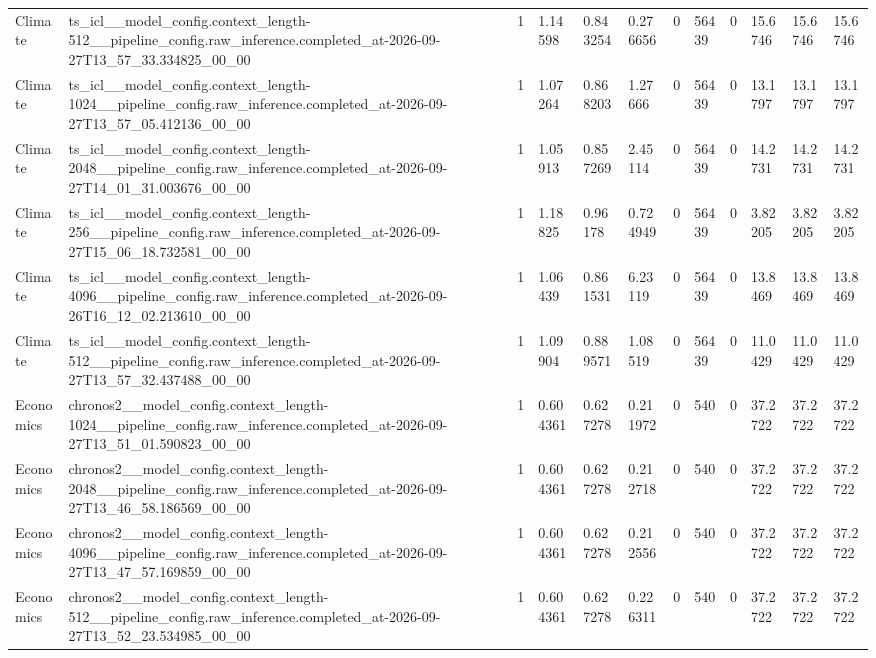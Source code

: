 \begin{tabular}{llllllllllll}
Climate & ts\_icl\_\_model\_config.context\_length-512\_\_pipeline\_config.raw\_inference.completed\_at-2026-09-27T13\_57\_33.334825\_00\_00 & 1 & 1.14598 & 0.843254 & 0.276656 & 0 & 56439 & 0 & 15.6746 & 15.6746 & 15.6746 \\
Climate & ts\_icl\_\_model\_config.context\_length-1024\_\_pipeline\_config.raw\_inference.completed\_at-2026-09-27T13\_57\_05.412136\_00\_00 & 1 & 1.07264 & 0.868203 & 1.27666 & 0 & 56439 & 0 & 13.1797 & 13.1797 & 13.1797 \\
Climate & ts\_icl\_\_model\_config.context\_length-2048\_\_pipeline\_config.raw\_inference.completed\_at-2026-09-27T14\_01\_31.003676\_00\_00 & 1 & 1.05913 & 0.857269 & 2.45114 & 0 & 56439 & 0 & 14.2731 & 14.2731 & 14.2731 \\
Climate & ts\_icl\_\_model\_config.context\_length-256\_\_pipeline\_config.raw\_inference.completed\_at-2026-09-27T15\_06\_18.732581\_00\_00 & 1 & 1.18825 & 0.96178 & 0.724949 & 0 & 56439 & 0 & 3.82205 & 3.82205 & 3.82205 \\
Climate & ts\_icl\_\_model\_config.context\_length-4096\_\_pipeline\_config.raw\_inference.completed\_at-2026-09-26T16\_12\_02.213610\_00\_00 & 1 & 1.06439 & 0.861531 & 6.23119 & 0 & 56439 & 0 & 13.8469 & 13.8469 & 13.8469 \\
Climate & ts\_icl\_\_model\_config.context\_length-512\_\_pipeline\_config.raw\_inference.completed\_at-2026-09-27T13\_57\_32.437488\_00\_00 & 1 & 1.09904 & 0.889571 & 1.08519 & 0 & 56439 & 0 & 11.0429 & 11.0429 & 11.0429 \\
Economics & chronos2\_\_model\_config.context\_length-1024\_\_pipeline\_config.raw\_inference.completed\_at-2026-09-27T13\_51\_01.590823\_00\_00 & 1 & 0.604361 & 0.627278 & 0.211972 & 0 & 540 & 0 & 37.2722 & 37.2722 & 37.2722 \\
Economics & chronos2\_\_model\_config.context\_length-2048\_\_pipeline\_config.raw\_inference.completed\_at-2026-09-27T13\_46\_58.186569\_00\_00 & 1 & 0.604361 & 0.627278 & 0.212718 & 0 & 540 & 0 & 37.2722 & 37.2722 & 37.2722 \\
Economics & chronos2\_\_model\_config.context\_length-4096\_\_pipeline\_config.raw\_inference.completed\_at-2026-09-27T13\_47\_57.169859\_00\_00 & 1 & 0.604361 & 0.627278 & 0.212556 & 0 & 540 & 0 & 37.2722 & 37.2722 & 37.2722 \\
Economics & chronos2\_\_model\_config.context\_length-512\_\_pipeline\_config.raw\_inference.completed\_at-2026-09-27T13\_52\_23.534985\_00\_00 & 1 & 0.604361 & 0.627278 & 0.226311 & 0 & 540 & 0 & 37.2722 & 37.2722 & 37.2722 \\

\end{tabular}
